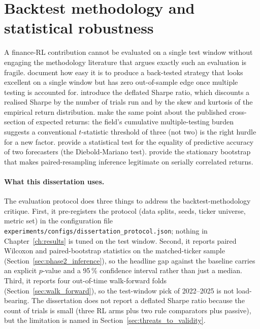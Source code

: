 \section{Backtest methodology and statistical robustness}
\label{sec:backtest_methodology}

A finance-RL contribution cannot be evaluated on a single test window without engaging the methodology literature that argues exactly such an evaluation is fragile. \textcite{bailey2014pseudo} document how easy it is to produce a back-tested strategy that looks excellent on a single window but has zero out-of-sample edge once multiple testing is accounted for. \textcite{bailey2014deflated} introduce the deflated Sharpe ratio, which discounts a realised Sharpe by the number of trials run and by the skew and kurtosis of the empirical return distribution. \textcite{harvey2016cross} make the same point about the published cross-section of expected returns: the field's cumulative multiple-testing burden suggests a conventional $t$-statistic threshold of three (not two) is the right hurdle for a new factor. \textcite{diebold1995comparing} provide a statistical test for the equality of predictive accuracy of two forecasters (the Diebold-Mariano test). \textcite{politis1994stationary} provide the stationary bootstrap that makes paired-resampling inference legitimate on serially correlated returns.

\paragraph{What this dissertation uses.} The evaluation protocol does three things to address the backtest-methodology critique. First, it pre-registers the protocol (data splits, seeds, ticker universe, metric set) in the configuration file \texttt{experiments/configs/dissertation\_protocol.json}; nothing in Chapter~\ref{ch:results} is tuned on the test window. Second, it reports paired Wilcoxon and paired-bootstrap statistics on the matched-ticker sample (Section~\ref{sec:phase2_inference}), so the headline gap against the baseline carries an explicit $p$-value and a 95\,\% confidence interval rather than just a median. Third, it reports four out-of-time walk-forward folds (Section~\ref{sec:walk_forward}), so the test-window pick of 2022--2025 is not load-bearing. The dissertation does not report a deflated Sharpe ratio because the count of trials is small (three RL arms plus two rule comparators plus passive), but the limitation is named in Section~\ref{sec:threats_to_validity}.

